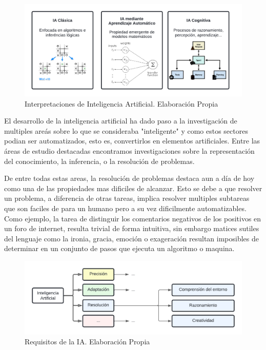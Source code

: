 \begin{itemize}
	      \begin{figure}[!hbp]
		      \centering
		      \includegraphics[scale=0.32, trim=0.9cm 0.9cm 0.9cm 0.9cm]{figs/AI-interpretations.png}
		      \caption{\small Interpretaciones de Inteligencia Artificial. Elaboración Propia}
		      \label{fig:etiqueta}
	      \end{figure}

\end{itemize}


El desarrollo de la inteligencia artificial ha dado paso a la investigación de
multiples areás sobre lo que se consideraba "inteligente" y como estos sectores
podian ser automatizados, esto es, convertirlos en elementos artificiales.
Entre las áreas de estudio destacadas encontramos investigaciones sobre la
representación del conocimiento, la inferencia, o la resolución de problemas.

De entre todas estas areas, la resolución de problemas destaca aun a día de hoy
como una de las propiedades mas dificiles de alcanzar. Esto se debe a que
resolver un problema, a diferencia de otras tareas, implica resolver multiples
subtareas que son faciles de para un humano pero a su vez dificilmente
automatizables. Como ejemplo, la tarea de distinguir los comentarios negativos
de los positivos en un foro de internet, resulta trivial de forma intuitiva, sin
embargo matices sutiles del lenguaje como la ironia, gracia, emoción o
exageración resultan imposibles de determinar en un conjunto de pasos que
ejecuta un algoritmo o maquina.

\begin{figure}[!hbp]
	\centering
	\includegraphics[scale=0.3, trim=0.5cm 0.5cm 0.5cm 0.5cm]{figs/AI-properties.png}
	\caption{\small Requisitos de la IA. Elaboración Propia}
	\label{fig:etiqueta}
\end{figure}


